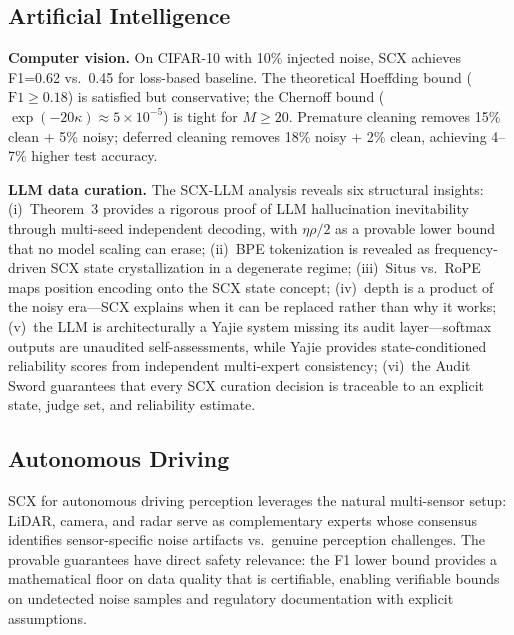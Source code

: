 \documentclass[twocolumn]{article}
\theoremstyle{definition}
\begin{document}
\subsection{Artificial Intelligence}

\textbf{Computer vision.} On CIFAR-10 with 10\% injected noise, SCX achieves F1=0.62 vs.\ 0.45 for loss-based baseline. The theoretical Hoeffding bound ($\mathrm{F1} \geq 0.18$) is satisfied but conservative; the Chernoff bound ($\exp(-20\kappa) \approx 5\times 10^{-5}$) is tight for $M \geq 20$. Premature cleaning removes 15\% clean + 5\% noisy; deferred cleaning removes 18\% noisy + 2\% clean, achieving 4--7\% higher test accuracy.

\textbf{LLM data curation.} The SCX-LLM analysis reveals six structural insights: (i)~Theorem~3 provides a rigorous proof of LLM hallucination inevitability through multi-seed independent decoding, with $\eta\rho/2$ as a provable lower bound that no model scaling can erase; (ii)~BPE tokenization is revealed as frequency-driven SCX state crystallization in a degenerate regime; (iii)~Situs vs.\ RoPE maps position encoding onto the SCX state concept; (iv)~depth is a product of the noisy era---SCX explains when it can be replaced rather than why it works; (v)~the LLM is architecturally a Yajie system missing its audit layer---softmax outputs are unaudited self-assessments, while Yajie provides state-conditioned reliability scores from independent multi-expert consistency; (vi)~the Audit Sword guarantees that every SCX curation decision is traceable to an explicit state, judge set, and reliability estimate.

\vspace{0.3cm}
\subsection{Autonomous Driving}

SCX for autonomous driving perception leverages the natural multi-sensor setup: LiDAR, camera, and radar serve as complementary experts whose consensus identifies sensor-specific noise artifacts vs.\ genuine perception challenges. The provable guarantees have direct safety relevance: the F1 lower bound provides a mathematical floor on data quality that is certifiable, enabling verifiable bounds on undetected noise samples and regulatory documentation with explicit assumptions.
\end{document}
